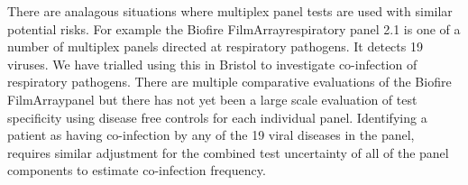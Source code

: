 \documentclass[10pt,letterpaper]{article}
\begin{document}
There are analagous situations where multiplex panel tests are used with similar potential risks. For example the Biofire FilmArray\texttrademark respiratory panel 2.1 is one of a number of multiplex panels directed at respiratory pathogens\cite{ramanan2017}. It detects 19 viruses\cite{chang2022,loeffelholz2020}. We have trialled using this in Bristol to investigate co-infection of respiratory pathogens. There are multiple comparative evaluations of the Biofire FilmArray\texttrademark panel\cite{popowitch2020,murphy2020,loeffelholz2020,leber2018,babady2013,chan2018} but there has not yet been a large scale evaluation of test specificity using disease free controls for each individual panel. Identifying a patient as having co-infection by any of the 19 viral diseases in the panel, requires similar adjustment for the combined test uncertainty of all of the panel components to estimate co-infection frequency.

\end{document}
